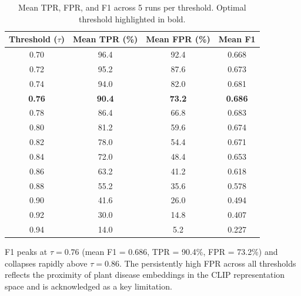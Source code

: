 \begin{table}[h]
    \centering
    \caption{Mean TPR, FPR, and F1 across 5 runs per threshold.
             Optimal threshold highlighted in bold.}
    \label{tab:few_shot_threshold}
    \begin{tabular}{cccc}
        \hline
        \textbf{Threshold ($\tau$)} & \textbf{Mean TPR (\%)} & \textbf{Mean FPR (\%)} & \textbf{Mean F1} \\
        \hline
        0.70 & 96.4 & 92.4 & 0.668 \\
        0.72 & 95.2 & 87.6 & 0.673 \\
        0.74 & 94.0 & 82.0 & 0.681 \\
        \textbf{0.76} & \textbf{90.4} & \textbf{73.2} & \textbf{0.686} \\
        0.78 & 86.4 & 66.8 & 0.683 \\
        0.80 & 81.2 & 59.6 & 0.674 \\
        0.82 & 78.0 & 54.4 & 0.671 \\
        0.84 & 72.0 & 48.4 & 0.653 \\
        0.86 & 63.2 & 41.2 & 0.618 \\
        0.88 & 55.2 & 35.6 & 0.578 \\
        0.90 & 41.6 & 26.0 & 0.494 \\
        0.92 & 30.0 & 14.8 & 0.407 \\
        0.94 & 14.0 &  5.2 & 0.227 \\
        \hline
    \end{tabular}
\end{table}

F1 peaks at $\tau = 0.76$ (mean F1 = 0.686, TPR = 90.4\%, FPR = 73.2\%) and
collapses rapidly above $\tau = 0.86$.
The persistently high FPR across all thresholds reflects the proximity of
plant disease embeddings in the CLIP representation space and is acknowledged
as a key limitation.


